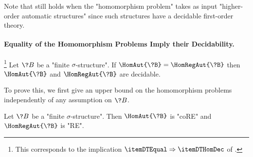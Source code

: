 Note that  still holds
when the "homomorphism problem" takes as input "higher-order automatic
structures" since such structures have a decidable first-order theory.

\paragraph*{Equality of the Homomorphism Problems Imply their Decidability.}

\begin{proposition}
	\!\footnote{This corresponds to the implication $\itemDTEqual \Rightarrow \itemDTHomDec$
	of .}
	\AP\label{prop:dichotomy-Equal-implies-HomDec}
	Let $\?B$ be a "finite $\sigma$-structure".
	If $\HomAut{\?B} = \HomRegAut{\?B}$ then $\HomAut{\?B}$ and $\HomRegAut{\?B}$
	are decidable.
\end{proposition}

To prove this, we first give an upper bound on the homomorphism problems independently
of any assumption on $\?B$.
\begin{proposition}
	\AP\label{prop:dichotomy-general-upper-bounds}
	Let $\?B$ be a "finite $\sigma$-structure".
	Then $\HomAut{\?B}$ is "coRE" and $\HomRegAut{\?B}$ is "RE".
\end{proposition}

